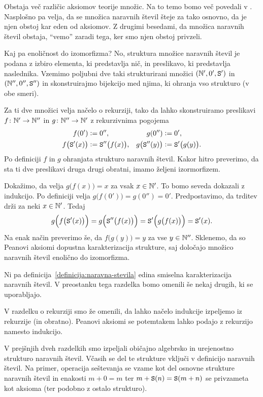 Obstaja več različic aksiomov teorije množic. Na to temo bomo več povedali v . Nasplošno pa velja, da se množica naravnih števil šteje za tako osnovno, da je njen obstoj kar eden od aksiomov.  Z drugimi besedami, da množica naravnih števil obstaja, ``vemo'' zaradi tega, ker smo njen obstoj privzeli.

Kaj pa enoličnost do izomorfizma? No, struktura množice naravnih števil je podana z izbiro elementa, ki predstavlja nič, in preslikavo, ki predstavlja naslednika. Vzemimo poljubni dve taki strukturirani množici $(\mathbb{N}', 0', \mathtt{S}')$ in $(\mathbb{N}'', 0'', \mathtt{S}'')$ in skonstruirajmo bijekcijo med njima, ki ohranja vso strukturo (v obe smeri).

Za ti dve množici velja načelo o rekurziji, tako da lahko skonstruiramo preslikavi $f\colon \mathbb{N}' \to \mathbb{N}''$ in $g\colon \mathbb{N}'' \to \mathbb{N}'$ z rekurzivnima pogojema
\begin{align*}
f(0') &\mathrel{\mathop:}= 0'', & g(0'') &\mathrel{\mathop:}= 0', \\
f\big(\mathtt{S}'(x)\big) &\mathrel{\mathop:}= \mathtt{S}''\big(f(x)\big), & g\big(\mathtt{S}''(y)\big) &\mathrel{\mathop:}= \mathtt{S}'\big(g(y)\big).
\end{align*}
Po definiciji $f$ in $g$ ohranjata strukturo naravnih števil. Kakor hitro preverimo, da sta ti dve preslikavi druga drugi obratni, imamo željeni izormorfizem.

Dokažimo, da velja $g\big(f(x)\big) = x$ za vsak $x \in \mathbb{N}'$. To bomo seveda dokazali z indukcijo. Po definiciji velja $g\big(f(0')\big) = g(0'') = 0'$. Predpostavimo, da trditev drži za neki $x \in \mathbb{N}'$. Tedaj
\[g\Big(f\big(\mathtt{S}'(x)\big)\Big) = g\Big(\mathtt{S}''\big(f(x)\big)\Big) = \mathtt{S}'\Big(g\big(f(x)\big)\Big) = \mathtt{S}'(x).\]
Na enak način preverimo še, da $f\big(g(y)\big) = y$ za vse $y \in \mathbb{N}''$. Sklenemo, da so Peanovi aksiomi dopustna karakterizacija strukture, saj določajo množico naravnih števil enolično do izomorfizma.

Ni pa definicija~\ref{definicija:naravna-stevila} edina smiselna karakterizacija naravnih števil. V preostanku tega razdelka bomo omenili še nekaj drugih, ki se uporabljajo.

V razdelku o rekurziji smo že omenili, da lahko načelo indukcije izpeljemo iz rekurzije (in obratno). Peanovi aksiomi se potemtakem lahko podajo z rekurzijo namesto indukcijo.

V prejšnjih dveh razdelkih smo izpeljali običajno algebrsko in urejenostno strukturo naravnih števil. Včasih se del te strukture vključi v definicijo naravnih števil. Na primer, operacija seštevanja se vzame kot del osnovne strukture naravnih števil in enakosti $m + 0 = m$ ter $m + \mathtt{S}(n) = \mathtt{S}(m + n)$ se privzameta kot aksioma (ter podobno z ostalo strukturo).

